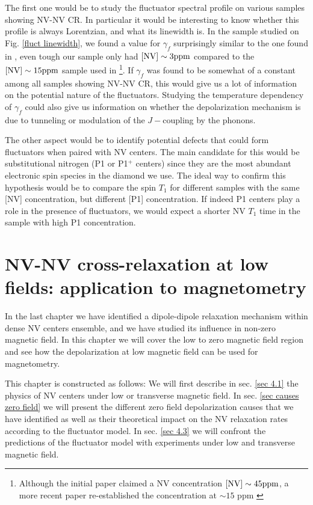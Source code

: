 \documentclass[a4paper, 11pt]{book}
\begin{document}
The first one would be to study the fluctuator spectral profile on various samples showing NV-NV CR. In particular it would be interesting to know whether this profile is always Lorentzian, and what its linewidth is. In the sample studied on Fig. \ref{fluct linewidth}, we found a value for $\gamma_f$ surprisingly similar to the one found in \citep{choi2017depolarization}, even tough our sample only had $[\rm NV] \sim 3 ppm$ compared to the $[\rm NV] \sim 15 ppm$ sample used in \citep{choi2017depolarization} \footnote{Although the initial paper claimed a NV concentration $[\rm NV] \sim 45 ppm$, a more recent paper re-established the concentration at $\sim 15$ ppm \citep{zhou2020quantum}}. If $\gamma_f$ was found to be somewhat of a constant among all samples showing NV-NV CR, this would give us a lot of information on the potential nature of the fluctuators. Studying the temperature dependency of $\gamma_f$ could also give us information on whether the depolarization mechanism is due to tunneling or modulation of the $J-$coupling by the phonons.

The other aspect would be to identify potential defects that could form fluctuators when paired with NV centers. The main candidate for this would be substitutional nitrogen (P1 or P1$^+$ centers) since they are the most abundant electronic spin species in the diamond we use. The ideal way to confirm this hypothesis would be to compare the spin $T_1$ for  different samples with the same [NV] concentration, but different [P1] concentration. If indeed P1 centers play a role in the presence of fluctuators, we would expect a shorter NV $T_1$ time in the sample with high P1 concentration.



\chapter{NV-NV cross-relaxation at low fields: application to magnetometry}

In the last chapter we have identified a dipole-dipole relaxation mechanism within dense NV centers ensemble, and we have studied its influence in non-zero magnetic field. In this chapter we will cover the low to zero magnetic field region and see how the depolarization at low magnetic field can be used for magnetometry.

This chapter is constructed as follows: We will first describe in sec. \ref{sec 4.1} the physics of NV centers under low or transverse magnetic field. In sec. \ref{sec causes zero field}
we will present the different zero field depolarization causes that we have identified as well as their theoretical impact on the NV relaxation rates according to the fluctuator model. In sec. \ref{sec 4.3} we will confront the predictions of the fluctuator model with experiments under low and transverse magnetic field. 
\end{document}
